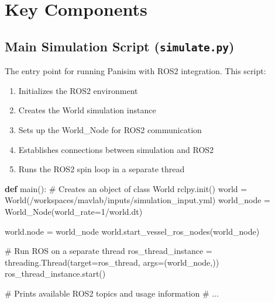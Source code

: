 \documentclass[
  letterpaper,
  DIV=11,
  numbers=noendperiod]{scrreprt}
\newenvironment{Shaded}{\begin{snugshade}}{\end{snugshade}}
\newcommand{\CommentTok}[1]{\textcolor[rgb]{0.37,0.37,0.37}{#1}}
\newcommand{\DecValTok}[1]{\textcolor[rgb]{0.68,0.00,0.00}{#1}}
\newcommand{\KeywordTok}[1]{\textcolor[rgb]{0.00,0.23,0.31}{\textbf{#1}}}
\newcommand{\NormalTok}[1]{\textcolor[rgb]{0.00,0.23,0.31}{#1}}
\newcommand{\OperatorTok}[1]{\textcolor[rgb]{0.37,0.37,0.37}{#1}}
\newcommand{\StringTok}[1]{\textcolor[rgb]{0.13,0.47,0.30}{#1}}
\providecommand{\tightlist}{%
  \setlength{\itemsep}{0pt}\setlength{\parskip}{0pt}}\usepackage{longtable,booktabs,array}
\begin{document}
\section*{Key Components}\label{key-components}


\subsection*{\texorpdfstring{Main Simulation Script
(\texttt{simulate.py})}{Main Simulation Script (simulate.py)}}\label{main-simulation-script-simulate.py}

The entry point for running Panisim with ROS2 integration. This script:

\begin{enumerate}
\def\labelenumi{\arabic{enumi}.}
\tightlist
\item
  Initializes the ROS2 environment
\item
  Creates the World simulation instance
\item
  Sets up the World\_Node for ROS2 communication
\item
  Establishes connections between simulation and ROS2
\item
  Runs the ROS2 spin loop in a separate thread
\end{enumerate}

\begin{Shaded}
\begin{Highlighting}[]
\KeywordTok{def}\NormalTok{ main():}
    \CommentTok{\# Creates an object of class \textquotesingle{}World\textquotesingle{}}
\NormalTok{    rclpy.init()}
\NormalTok{    world }\OperatorTok{=}\NormalTok{ World(}\StringTok{\textquotesingle{}/workspaces/mavlab/inputs/simulation\_input.yml\textquotesingle{}}\NormalTok{)}
\NormalTok{    world\_node }\OperatorTok{=}\NormalTok{ World\_Node(world\_rate}\OperatorTok{=}\DecValTok{1}\OperatorTok{/}\NormalTok{world.dt)}
  
\NormalTok{    world.node }\OperatorTok{=}\NormalTok{ world\_node}
\NormalTok{    world.start\_vessel\_ros\_nodes(world\_node)}

    \CommentTok{\# Run ROS on a separate thread}
\NormalTok{    ros\_thread\_instance }\OperatorTok{=}\NormalTok{ threading.Thread(target}\OperatorTok{=}\NormalTok{ros\_thread, args}\OperatorTok{=}\NormalTok{(world\_node,))}
\NormalTok{    ros\_thread\_instance.start()}
    
    \CommentTok{\# Prints available ROS2 topics and usage information}
    \CommentTok{\# ...}
\end{Highlighting}
\end{Shaded}
\end{document}
